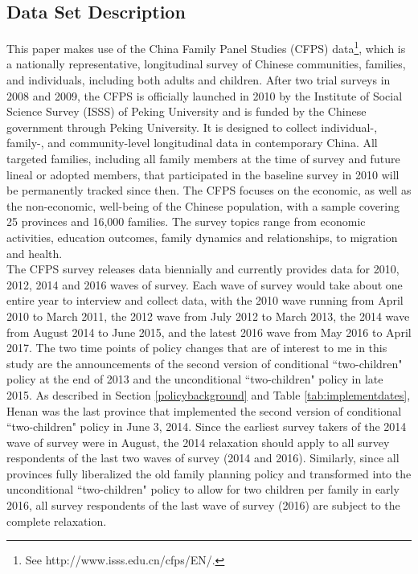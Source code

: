 \documentclass[12pt]{extarticle}
\begin{document}
\subsection{Data Set Description}
This paper makes use of the China Family Panel Studies (CFPS) data\footnote{See http://www.isss.edu.cn/cfps/EN/.}, which is a nationally representative, longitudinal survey of Chinese communities, families, and individuals, including both adults and children. After two trial surveys in 2008 and 2009, the CFPS is officially launched in 2010 by the Institute of Social Science Survey (ISSS) of Peking University and is funded by the Chinese government through Peking University. It is designed to collect individual-, family-, and community-level longitudinal data in contemporary China. All targeted families, including all family members at the time of survey and future lineal or adopted members, that participated in the baseline survey in 2010 will be permanently tracked since then. The CFPS focuses on the economic, as well as the non-economic, well-being of the Chinese population, with a sample covering 25 provinces and 16,000 families. The survey topics range from economic activities, education outcomes, family dynamics and relationships, to migration and health. \\
\indent The CFPS survey releases data biennially and currently provides data for 2010, 2012, 2014 and 2016 waves of survey. Each wave of survey would take about one entire year to interview and collect data, with the 2010 wave running from April 2010 to March 2011, the 2012 wave from July 2012 to March 2013, the 2014 wave from August 2014 to June 2015, and the latest 2016 wave from May 2016 to April 2017. The two time points of policy changes that are of interest to me in this study are the announcements of the second version of conditional ``two-children" policy at the end of 2013 and the unconditional ``two-children" policy in late 2015. As described in Section \ref{policybackground} and Table \ref{tab:implementdates}, Henan was the last province that implemented the second version of conditional ``two-children" policy in June 3, 2014. Since the earliest survey takers of the 2014 wave of survey were in August, the 2014 relaxation should apply to all survey respondents of the last two waves of survey (2014 and 2016). Similarly, since all provinces fully liberalized the old family planning policy and transformed into the unconditional ``two-children" policy to allow for two children per family in early 2016, all survey respondents of the last wave of survey (2016) are subject to the complete relaxation. \\
\end{document}
